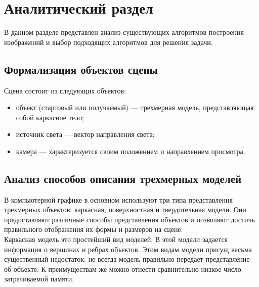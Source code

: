\chapter{Аналитический раздел}

В данном разделе представлен анализ существующих алгоритмов построения изображений и выбор подходящих алгоритмов для решения задачи.

\section{Формализация объектов сцены}
Сцена состоит из следующих объектов:

\begin{itemize}[label*=---]
	\item объект (стартовый или получаемый) --- трехмерная модель, представляющая собой каркасное тело;
	\item источник света --- вектор направления света;
	\item камера --- характеризуется своим положением и направлением просмотра.
\end{itemize}

\newpage

\section{Анализ способов описания трехмерных моделей}

В компьютерной графике в основном используют три типа представления трехмерных объектов: каркасная, поверхностная и твердотельная модели.
Они предоставляют различные способы представления объектов и позволяют 
достичь правильного отображения их формы и размеров на сцене.\\ %


Каркасная модель это простейший вид моделей. В этой модели задается информация о вершинах и ребрах объектов. Этим видам модели присущ весьма существенный недостаток: не всегда модель правильно передает представление об объекте. К преимуществам же можно отнести сравнительно низкое число затрачиваемой памяти.\\


